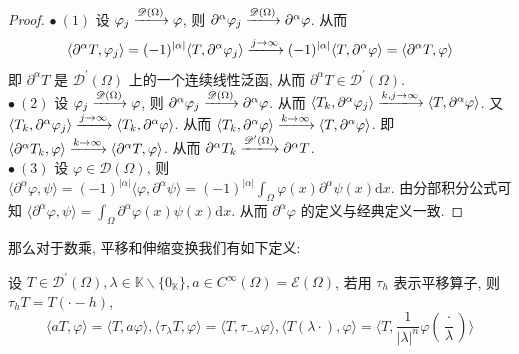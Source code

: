 \documentclass[11pt]{ctexart}[UTF8]
\begin{document}
\begin{proof}
    $\bullet\ (1)$ 设 $\varphi_{j} \xlongrightarrow{\mathscr{D}(\Omega)} \varphi$, 则 $\partial^{\alpha} \varphi_{j} \xlongrightarrow{\mathscr{D}(\Omega)} \partial^{\alpha} \varphi$. 从而
    \begin{equation*}
        \langle \partial^{\alpha} T, \varphi_{j} \rangle = (-1)^{|\alpha|} \langle T, \partial^{\alpha} \varphi_{j} \rangle \xlongrightarrow{j \to \infty} (-1)^{|\alpha|} \langle T, \partial^{\alpha} \varphi \rangle = \langle \partial^{\alpha} T, \varphi \rangle
    \end{equation*}
    即 $\partial^{\alpha} T$ 是 $\mathscr{D}^{\prime}(\Omega)$ 上的一个连续线性泛函, 从而 $\partial^{\alpha} T\in \mathscr{D}^{\prime}(\Omega)$.\\
    $\bullet\ (2)$ 设 $\varphi_{j} \xlongrightarrow{\mathscr{D}(\Omega)} \varphi$, 则 $\partial^{\alpha}\varphi_{j} \xlongrightarrow{\mathscr{D}(\Omega)} \partial^{\alpha}\varphi$. 从而
    $\langle T_{k},\partial^{\alpha}\varphi_{j}\rangle\xlongrightarrow{k,j\to\infty}\langle T,\partial^{\alpha}\varphi\rangle$. 又
    $\langle T_{k},\partial^{\alpha}\varphi_{j}\rangle\xlongrightarrow{j\to\infty}\langle T_{k},\partial^{\alpha}\varphi\rangle$. 从而 $\langle T_{k},\partial^{\alpha}\varphi\rangle\xlongrightarrow{k\to\infty}\langle T,\partial^{\alpha}\varphi\rangle$. 即 $\langle \partial^{\alpha} T_k, \varphi\rangle\xlongrightarrow{k\to\infty}\langle \partial^{\alpha} T,
\varphi\rangle$. 从而 $\partial^{\alpha} T_{k} \xlongrightarrow{\mathscr{D}^{\prime}(\Omega)} \partial^{\alpha} T$.\\
    $\bullet\ (3)$ 设 $\varphi \in \mathscr{D}(\Omega)$, 则 $\langle \partial^{\alpha} \varphi, \psi \rangle = (-1)^{|\alpha|} \langle \varphi
, \partial^{\alpha} \psi \rangle = (-1)^{|\alpha|} \int_{\Omega} \varphi(x) \partial^{\alpha} \psi(x) \mathrm{d}x$. 由分部积分公式可知 $\langle \partial^{\alpha} \varphi, \psi \rangle = \int_{\Omega} \partial^{\alpha} \varphi(x) \psi(x) \mathrm{d}x$. 从而 $\partial^{\alpha} \varphi$ 的定义与经典定义一致.

\end{proof}
那么对于数乘, 平移和伸缩变换我们有如下定义:
\begin{definition}
    设 $T \in \mathscr{D}^{\prime}(\Omega), \lambda \in \mathbb{K}\backslash\{0_{\mathbb{K}}\}, a \in C^{\infty}(\Omega)=\mathscr{E}(\Omega)$, 若用 $\tau_{h}$ 表示平移算子, 则 $\tau_{h} T = T(\cdot - h)$,
    \begin{equation*}
        \langle a T, \varphi \rangle =  \langle T, a\varphi \rangle, \langle \tau_{\lambda} T, \varphi \rangle = \langle T, \tau_{-\lambda} \varphi \rangle, \langle T(\lambda \cdot), \varphi \rangle = \langle T, \frac{1}{|\lambda|^{n}}\varphi(\frac{\cdot}{\lambda}) \rangle
    \end{equation*}
\end{definition}
\end{document}
